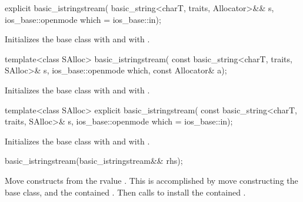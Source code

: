 %
\begin{itemdecl}
explicit basic_istringstream(
  basic_string<charT, traits, Allocator>&& s,
  ios_base::openmode which = ios_base::in);
\end{itemdecl}

\begin{itemdescr}
\pnum
\effects
Initializes the base class with
and  with
.
\end{itemdescr}

%
\begin{itemdecl}
template<class SAlloc>
  basic_istringstream(
    const basic_string<charT, traits, SAlloc>& s,
    ios_base::openmode which, const Allocator& a);
\end{itemdecl}

\begin{itemdescr}
\pnum
\effects
Initializes the base class with
and  with
\linebreak{}. %
\end{itemdescr}

%
\begin{itemdecl}
template<class SAlloc>
  explicit basic_istringstream(
    const basic_string<charT, traits, SAlloc>& s,
    ios_base::openmode which = ios_base::in);
\end{itemdecl}

\begin{itemdescr}
\pnum
\effects
Initializes the base class with
and  with
.
\end{itemdescr}

%
\begin{itemdecl}
basic_istringstream(basic_istringstream&& rhs);
\end{itemdecl}

\begin{itemdescr}
\pnum
\effects
Move constructs from the rvalue . This
is accomplished by move constructing the base class, and the contained
.
Then calls 
to install the contained .
\end{itemdescr}

